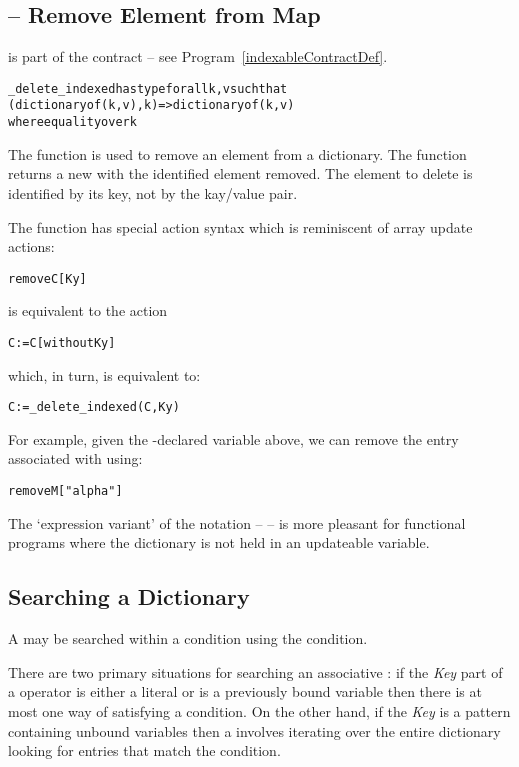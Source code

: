 \subsection{ -- Remove Element from Map}
\label{mapDeleteFunction}
 is part of the  contract -- see Program~\vref{indexableContractDef}.
\begin{alltt}
\_delete\_indexed has type for all k,v such that
                           (dictionary of (k,v),k)=>dictionary of (k,v)
                           where equality over k
\end{alltt}
The  function is used to remove an element from a dictionary. The  function returns a new  with the identified element removed. The element to delete is identified by its key, not by the kay/value pair.

The  function has special action syntax which is reminiscent of array update actions:
\begin{alltt}
remove C[Ky]
\end{alltt}
is equivalent to the action
\begin{alltt}
C := C[without Ky]
\end{alltt}
which, in turn, is equivalent to:
\begin{alltt}
C := \_delete\_indexed(C,Ky)
\end{alltt}
For example, given the -declared variable  above, we can remove the entry associated with  using:
\begin{alltt}
remove M["alpha"]
\end{alltt}

The `expression variant' of the  notation --  -- is more pleasant for functional programs where the dictionary is not held in an updateable variable.

\subsection{Searching a Dictionary}
\label{searchMap}

A  may be searched within a condition using the  condition.

There are two primary situations for searching an associative : if the \emph{Key} part of a  operator is either a literal or is a previously bound variable then there is at most one way of satisfying a  condition. On the other hand, if the \emph{Key} is a pattern containing unbound variables then a  involves iterating over the entire dictionary looking for entries that match the condition.


